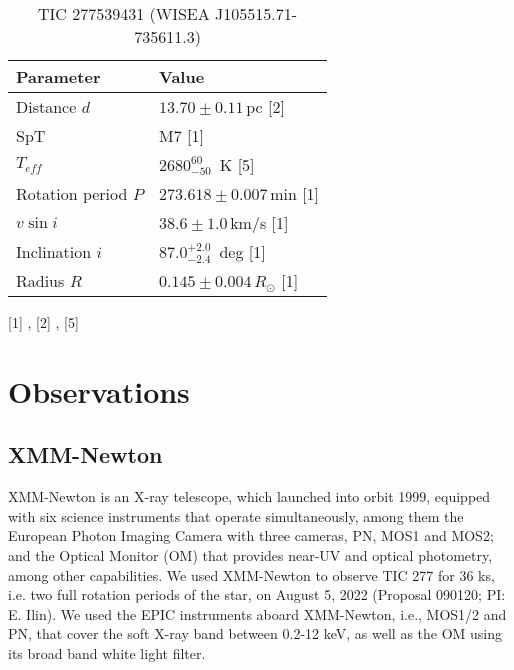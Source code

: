 \documentclass[twocolumn]{aastex631}
\begin{document}
\begin{table}

    \caption{TIC 277539431 (WISEA J105515.71-735611.3)}
    \begin{tabular}{ll}\hline 
         Parameter & Value  \\\hline
         Distance $d$ & $13.70\pm0.11\,$pc [2] \\
         SpT & M7 [1]\\
         $T_{eff}$ & $2680^{60}_{-50}\,$ K [5]\\
         Rotation period $P$ & $273.618 \pm 0.007\,$min [1]\\
         $v\sin i$ & $38.6\pm1.0\,$km/s [1] \\
         Inclination $i$ & $87.0^{+2.0}_{-2.4}\,$ deg [1]\\
         Radius $R$ & $0.145\pm0.004\,R_\odot$ [1]\\\hline
        
    \end{tabular}
    \newline\footnotesize
    [1] \citet{ilin2021giant}, 
    [2] \citet{bailer-jones2018estimating}, 
    [5] \citet{pecaut2013intrinsic}
    \label{tab:modelparams}
\end{table}


\section{Observations}

\subsection{XMM-Newton}
\label{sec:obs:xmm}
XMM-Newton is an X-ray telescope, which launched into orbit 1999, equipped with six science instruments that operate simultaneously, among them the European Photon Imaging Camera with three cameras, PN, MOS1 and MOS2; and the Optical Monitor (OM) that provides near-UV and optical photometry, among other capabilities.
We used XMM-Newton to observe TIC 277 for 36 ks, i.e. two full rotation periods of the star, on August 5, 2022 (Proposal 090120; PI: E. Ilin). We used the EPIC instruments aboard XMM-Newton, i.e., MOS1/2 and PN, that cover the soft X-ray band between 0.2-12 keV, as well as the OM using its broad band white light filter.
\end{document}
